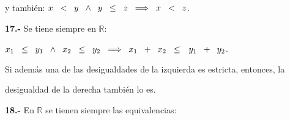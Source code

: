 \documentclass[12pt]{article}
\begin{document}
\hspace{2cm} y también: \hspace{1.5cm} $x\hspace{0.2cm}<\hspace{0.2cm}y\hspace{0.2cm} \wedge\hspace{0.2cm} y\hspace{0.2cm}\leq\hspace{0.2cm} z\hspace{0.2cm} \Longrightarrow\hspace{0.2cm} x\hspace{0.2cm}<\hspace{0.2cm}z$.
\vspace{0.3cm}

\textbf{17.-}  Se tiene siempre en $\mathbb{R}$: \vspace{0.2cm}

\hspace{2cm} $x_1 \hspace{0.2cm} \leq \hspace{0.2cm} y_1 \hspace{0.2cm} \wedge \hspace{0.2cm} x_2 \hspace{0.2cm} \leq\hspace{0.2cm} y_2\hspace{0.2cm} \Longrightarrow\hspace{0.2cm} x_1\hspace{0.2cm}+\hspace{0.2cm}x_2\hspace{0.2cm}\leq\hspace{0.2cm}$ $y_1\hspace{0.2cm}+\hspace{0.2cm}y_2$.\vspace{0.1cm}

Si además una de las desigualdades de la izquierda es estricta, entonces, la \par desigualdad de la derecha también lo es.
\vspace{0.2cm}

\textbf{18.-}  En $\mathbb{R}$ se tienen siempre las equivalencias: \vspace{0.2cm}
\end{document}
